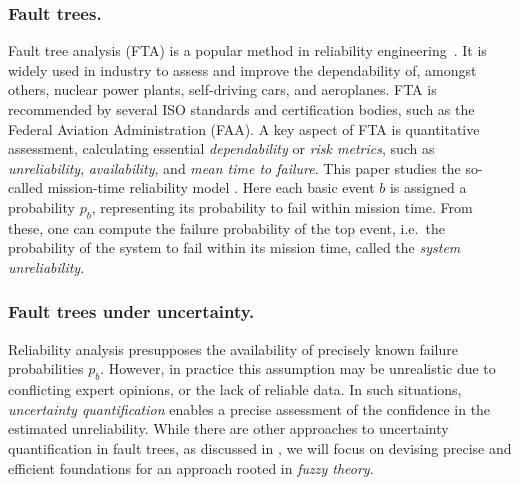 \documentclass[runningheads]{llncs}
\renewcommand{\emph}[1]{{\it #1}}
\begin{document}
\subsubsection{Fault trees.} Fault tree analysis (FTA) is a popular method in reliability engineering~\cite{stamatelatos2002fault,ruijters2015FTA}.
It is widely used in industry to assess and improve the dependability of, amongst others,
nuclear power plants, self-driving cars, and aeroplanes.
FTA is recommended by several ISO standards and certification bodies, such as the Federal Aviation Administration (FAA). 
A key aspect of FTA is quantitative assessment, calculating essential \emph{dependability} or \emph{risk metrics}, such as \emph{unreliability}, \emph{availability}, and \emph{mean time to failure}.
%
This paper studies the so-called mission-time reliability model \cite{stoelinga2025concise}. Here 
each basic event $b$
is assigned a probability $p_b$, representing  
its probability to fail within mission time. 
From these, one can compute the failure probability of the top event,
i.e.~the probability of the system to fail within its mission time, called the 
{\it system unreliability}.

\subsubsection{Fault trees under uncertainty.} Reliability analysis presupposes the availability of precisely known failure probabilities $p_b$. However, in practice this assumption may be unrealistic due to conflicting expert opinions, or the lack of reliable data. In such situations, \emph{uncertainty quantification} enables a precise assessment of the confidence in the estimated unreliability. While there are other approaches to uncertainty quantification in fault trees, as discussed in , we will focus on devising precise and efficient foundations for an approach rooted in \emph{fuzzy theory}.
\end{document}
